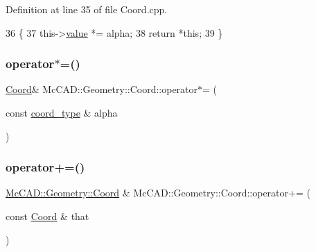 Definition at line 35 of file Coord.\+cpp.


\begin{DoxyCode}
36                                 \{
37     this->\hyperlink{classMcCAD_1_1Geometry_1_1Coord_a540aea93d3b1a9cfd505e1e0b96b2b91}{value} *= alpha;
38     \textcolor{keywordflow}{return} *\textcolor{keyword}{this};
39 \}
\end{DoxyCode}
\mbox{\label{classMcCAD_1_1Geometry_1_1Coord_a0cf00b71c3bae487459e2d73eb6e44ba}} 
\subsubsection{\texorpdfstring{operator$\ast$=()}{operator*=()}\hspace{0.1cm}{\footnotesize\ttfamily [2/2]}}
{\footnotesize\ttfamily \hyperlink{classMcCAD_1_1Geometry_1_1Coord}{Coord}\& Mc\+C\+A\+D\+::\+Geometry\+::\+Coord\+::operator$\ast$= (\begin{DoxyParamCaption}\item[{const \hyperlink{namespaceMcCAD_1_1Geometry_ac043b37a4a7e849fca22869e1982d2f8}{coord\+\_\+type} \&}]{alpha }\end{DoxyParamCaption})}

\mbox{\label{classMcCAD_1_1Geometry_1_1Coord_afa22a12fc6a6d696922cabcf8af935f7}} 
\subsubsection{\texorpdfstring{operator+=()}{operator+=()}\hspace{0.1cm}{\footnotesize\ttfamily [1/2]}}
{\footnotesize\ttfamily \hyperlink{classMcCAD_1_1Geometry_1_1Coord}{Mc\+C\+A\+D\+::\+Geometry\+::\+Coord} \& Mc\+C\+A\+D\+::\+Geometry\+::\+Coord\+::operator+= (\begin{DoxyParamCaption}\item[{const \hyperlink{classMcCAD_1_1Geometry_1_1Coord}{Coord} \&}]{that }\end{DoxyParamCaption})}




